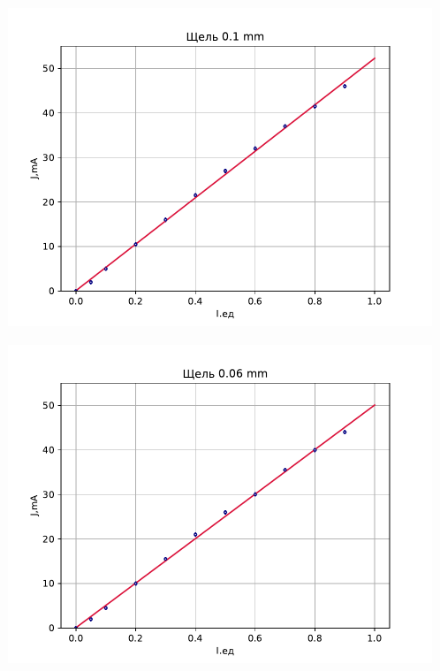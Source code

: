 \begin{center}
    \begin{figure}[H]
        \begin{minipage}{0.5\linewidth}
            \includegraphics[width=\linewidth]{scripts/z101mm} 
            \vspace{-30pt}
            \label{fig:9}
        \end{minipage}
    \begin{minipage}{0.5\linewidth}
        \includegraphics[width=\linewidth]{scripts/z1006mm} 
        \vspace{-30pt}
        \label{fig:10}
    \end{minipage}
    \end{figure}
\end{center}
